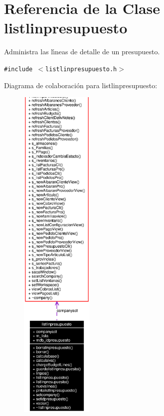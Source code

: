\section{Referencia de la Clase listlinpresupuesto}
\label{classlistlinpresupuesto}
Administra las l\'{\i}neas de detalle de un presupuesto.  


{\tt \#include $<$listlinpresupuesto.h$>$}

Diagrama de colaboraci\'{o}n para listlinpresupuesto:\begin{figure}[H]
\begin{center}
\leavevmode
\includegraphics[width=99pt]{classlistlinpresupuesto__coll__graph}
\end{center}
\end{figure}
